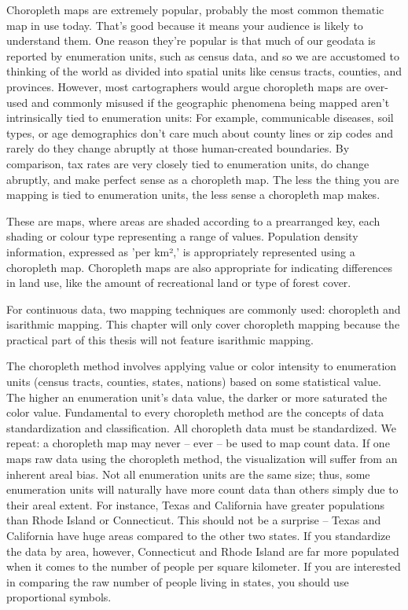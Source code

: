 Choropleth maps are extremely popular, probably the most common thematic map in use today. That's good because it means your audience is likely to understand them. One reason they're popular is that much of our geodata is reported by enumeration units, such as census data, and so we are accustomed to thinking of the world as divided into spatial units like census tracts, counties, and provinces. However, most cartographers would argue choropleth maps are over-used and commonly misused if the geographic phenomena being mapped aren't intrinsically tied to enumeration units: For example, communicable diseases, soil types, or age demographics don't care much about county lines or zip codes and rarely do they change abruptly at those human-created boundaries. By comparison, tax rates are very closely tied to enumeration units, do change abruptly, and make perfect sense as a choropleth map. The less the thing you are mapping is tied to enumeration units, the less sense a choropleth map makes.

These are maps, where areas are shaded according to a prearranged key, each shading or colour type representing a range of values. Population density information, expressed as 'per km²,' is appropriately represented using a choropleth map. Choropleth maps are also appropriate for indicating differences in land use, like the amount of recreational land or type of forest cover.



For continuous data, two mapping techniques are commonly used: choropleth and isarithmic mapping. This chapter will only cover choropleth mapping because the practical part of this thesis will not feature isarithmic mapping.


The choropleth method involves applying value or color
intensity to enumeration units (census tracts, counties, states, nations) based on some statistical
value. The higher an enumeration unit’s data value, the darker or more saturated the color value.
Fundamental to every choropleth method are the concepts of data standardization and
classification.
All choropleth data must be standardized. We repeat: a choropleth map may never – ever –
be used to map count data. If one maps raw data using the choropleth method, the visualization
will suffer from an inherent areal bias. Not all enumeration units are the same size; thus, some
enumeration units will naturally have more count data than others simply due to their areal
extent. For instance, Texas and California have greater populations than Rhode Island or
Connecticut. This should not be a surprise – Texas and California have huge areas compared to
the other two states. If you standardize the data by area, however, Connecticut and Rhode Island
are far more populated when it comes to the number of people per square kilometer. If you are
interested in comparing the raw number of people living in states, you should use proportional
symbols.
